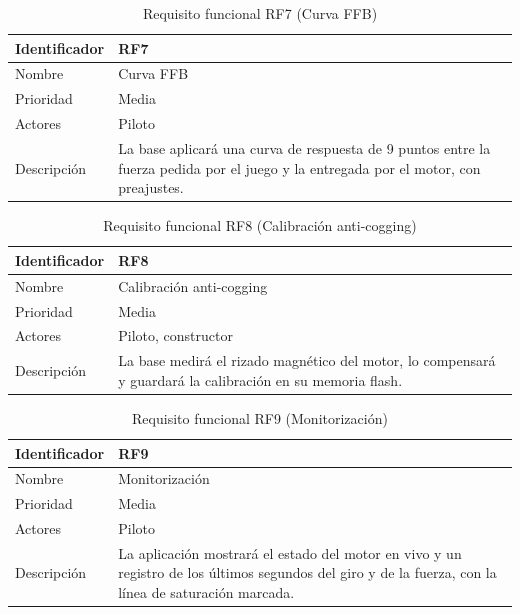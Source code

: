 \begin{table}[H]
	\centering
	\renewcommand{\arraystretch}{2}
	\begin{tabular}{|l|p{10cm}|}
		\hline
		Identificador & RF7 \\
		\hline
		Nombre & Curva FFB \\
		\hline
		Prioridad & Media \\
		\hline
		Actores & Piloto \\
		\hline
		Descripción & La base aplicará una curva de respuesta de 9 puntos entre la fuerza pedida por el juego y la entregada por el motor, con preajustes. \\
		\hline
	\end{tabular}
	\caption{Requisito funcional RF7 (Curva FFB)}
	\label{tab:rf7}
\end{table}

\begin{table}[H]
	\centering
	\renewcommand{\arraystretch}{2}
	\begin{tabular}{|l|p{10cm}|}
		\hline
		Identificador & RF8 \\
		\hline
		Nombre & Calibración anti-cogging \\
		\hline
		Prioridad & Media \\
		\hline
		Actores & Piloto, constructor \\
		\hline
		Descripción & La base medirá el rizado magnético del motor, lo compensará y guardará la calibración en su memoria flash. \\
		\hline
	\end{tabular}
	\caption{Requisito funcional RF8 (Calibración anti-cogging)}
	\label{tab:rf8}
\end{table}

\begin{table}[H]
	\centering
	\renewcommand{\arraystretch}{2}
	\begin{tabular}{|l|p{10cm}|}
		\hline
		Identificador & RF9 \\
		\hline
		Nombre & Monitorización \\
		\hline
		Prioridad & Media \\
		\hline
		Actores & Piloto \\
		\hline
		Descripción & La aplicación mostrará el estado del motor en vivo y un registro de los últimos segundos del giro y de la fuerza, con la línea de saturación marcada. \\
		\hline
	\end{tabular}
	\caption{Requisito funcional RF9 (Monitorización)}
	\label{tab:rf9}
\end{table}

